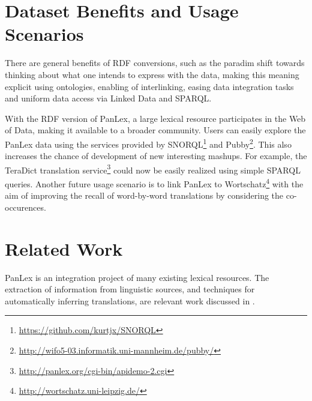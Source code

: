 \documentclass[sw]{iosart2c}
\newcommand*{\origtodo}{}
\let\origtodo\todo
\renewcommand*{\todo}{\origtodo[inline]}
\begin{document}
\section{Dataset Benefits and Usage Scenarios}
\label{sec:usage}
There are general benefits of RDF conversions,
such as the paradim shift towards thinking about what one intends to express
with the data, making this meaning explicit using ontologies,
enabling of interlinking, easing data integration tasks and uniform
data access via Linked Data and SPARQL.

With the RDF version of PanLex, a large lexical resource participates in the Web of Data,
making it available to a broader community. Users can easily explore the PanLex data using
the services provided by SNORQL\footnote{\url{https://github.com/kurtjx/SNORQL}} and Pubby\footnote{\url{http://wifo5-03.informatik.uni-mannheim.de/pubby/}}. This also increases the chance of development of
new interesting mashups.
For example, the TeraDict translation service\footnote{\url{http://panlex.org/cgi-bin/apidemo-2.cgi}}
could now be easily realized using simple SPARQL queries.
Another future usage scenario is to link PanLex to Wortschatz\footnote{\url{http://wortschatz.uni-leipzig.de/}} with the aim of 
improving the recall of word-by-word translations by considering the co-occurences.

\section{Related Work}
\label{sec:related}
PanLex is an integration project of many existing lexical resources. %
The extraction of information from linguistic sources, and
techniques for automatically inferring translations, are
relevant work discussed in \cite{panlex_probtrans}. 
\end{document}
